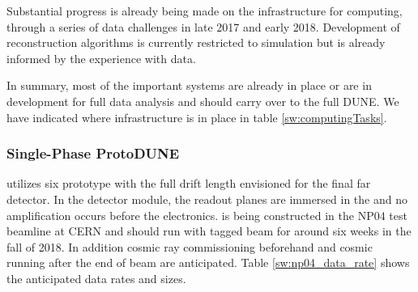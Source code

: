 Substantial progress is already being made on the infrastructure for computing, through a series of data challenges in late 2017 and early 2018. Development of reconstruction algorithms is currently restricted to simulation but is already informed by the experience with   data.


In summary, most of the important systems are already in place or are in development for full  data analysis and should carry over to the full DUNE.
We have indicated where infrastructure is in place in  table  \ref{sw:computingTasks}.




\subsubsection{Single-Phase ProtoDUNE}

 utilizes six prototype  with the full drift length envisioned for the final far detector. In the \single detector module, the readout planes are immersed in the \lar  and no amplification occurs before the electronics.     is being constructed in the NP04 test beamline at CERN and should run with tagged  beam for around six weeks in the fall of 2018.  In addition cosmic ray commissioning beforehand and cosmic running after the end of beam are anticipated.  Table \ref{sw:np04_data_rate}
shows the anticipated data rates and sizes. 


